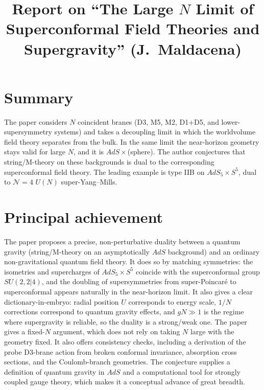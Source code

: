 \documentclass[11pt]{article}
\title{Report on ``The Large $N$ Limit of Superconformal Field Theories and Supergravity'' (J.~Maldacena)}
\date{}
\begin{document}
\maketitle

\section*{Summary}
The paper considers $N$ coincident branes (D3, M5, M2, D1+D5, and lower-supersymmetry systems) and takes a decoupling limit in which the worldvolume field theory separates from the bulk. In the same limit the near-horizon geometry stays valid for large $N$, and it is $AdS\times$(sphere). The author conjectures that string/M-theory on these backgrounds is dual to the corresponding superconformal field theory. The leading example is type IIB on $AdS_5\times S^5$, dual to $\mathcal N=4$ $U(N)$ super-Yang--Mills.

\section{Principal achievement}
The paper proposes a precise, non-perturbative duality between a quantum gravity (string/M-theory on an asymptotically $AdS$ background) and an ordinary non-gravitational quantum field theory. It does so by matching symmetries: the isometries and supercharges of $AdS_5\times S^5$ coincide with the superconformal group $SU(2,2|4)$, and the doubling of supersymmetries from super-Poincar\'e to superconformal appears naturally in the near-horizon limit. It also gives a clear dictionary-in-embryo: radial position $U$ corresponds to energy scale, $1/N$ corrections correspond to quantum gravity effects, and $gN\gg1$ is the regime where supergravity is reliable, so the duality is a strong/weak one. The paper gives a fixed-$N$ argument, which does not rely on taking $N$ large with the geometry fixed. It also offers consistency checks, including a derivation of the probe D3-brane action from broken conformal invariance, absorption cross sections, and the Coulomb-branch geometries. The conjecture supplies a definition of quantum gravity in $AdS$ and a computational tool for strongly coupled gauge theory, which makes it a conceptual advance of great breadth.
\end{document}
